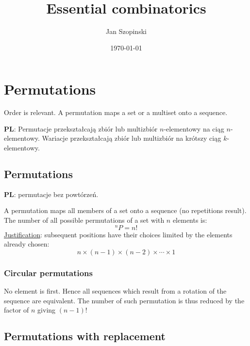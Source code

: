 \documentclass{article}
\newcommand{\pl}{\textbf{PL}: }
\begin{document}
\title{Essential combinatorics}
\author{Jan Szopinski}
\date{\frontdate\today}
\maketitle

\section{Permutations}

Order is relevant. A permutation maps a set or a multiset onto a sequence.

\begin{otherlanguage}{polish}
    \pl
    Permutacje przekształcają zbiór lub multizbiór $n$\nobreakdash-\hspace{0pt}elementowy na ciąg $n$\nobreakdash-\hspace{0pt}elementowy.
    Wariacje przekształcają zbiór lub multizbiór na krótszy ciąg $k$\nobreakdash-\hspace{0pt}elementowy.
\end{otherlanguage}

\subsection{Permutations}

\foreignlanguage{polish}{\pl permutacje bez powtórzeń.}

A permutation maps all members of a set onto a sequence (no repetitions result).
The number of all possible permutations of a set with $n$ elements is:
\begin{equation}
    ^nP = n!
\end{equation}
\underline{Justification}: subsequent positions have their choices limited by the elements already chosen:
\begin{equation*}
    n\times(n-1)\times(n-2)\times \dotsb \times 1
\end{equation*}

\subsubsection{Circular permutations}

No element is first.
Hence all sequences which result from a rotation of the sequence are equivalent.
The number of such permutation is thus reduced by the factor of $n$ giving ${(n-1)!}$

\subsection{Permutations with replacement}
\end{document}
